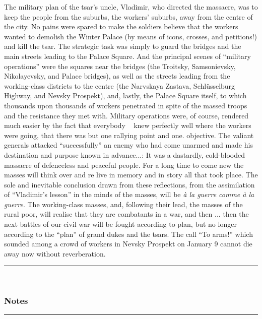 \documentclass[
]{article}
\begin{document}
The military plan of the tsar's uncle, Vladimir, who directed the
massacre, was to keep the people from the suburbs, the workers' suburbs,
away from the centre of the city. No pains were spared to make the
soldiers believe that the workers wanted to demolish the Winter Palace
(by means of icons, crosses, and petitions!) and kill the tsar. The
strategic task was simply to guard the bridges and the main streets
leading to the Palace Square. And the principal scenes of ``military
operations'' were the squares near the bridges (the Troitsky,
Samsonievsky, Nikolayevsky, and Palace bridges), as well as the streets
leading from the working-class districts to the centre (the Narvskaya
Zastava, Schlüsselburg Highway, and Nevsky Prospekt), and, lastly, the
Palace Square itself, to which thousands upon thousands of workers
penetrated in spite of the massed troops and the resistance they met
with. Military operations were, of course, rendered much easier by the
fact that everybody ~ knew perfectly well where the workers were going,
that there was but one rallying point and one. objective. The valiant
generals attacked ``successfully'' an enemy who had come unarmed and
made his destination and purpose known in advance...: It was a
dastardly, cold-blooded massacre of defenceless and peaceful people. For
a long time to come new the masses will think over and re live in memory
and in story all that took place. The sole and inevitable conclusion
drawn from these reflections, from the assimilation of ``Vladimir's
lesson'' in the minds of the masses, will be \emph{à la guerre comme à
la guerre}. The working-class masses, and, following their lead, the
masses of the rural poor, will realise that they are combatants in a
war, and then ... then the next battles of our civil war will be fought
according to plan, but no longer according to the ``plan'' of grand
dukes and the tsars. The call ``To arms!'' which sounded among a crowd
of workers in Nevsky Prospekt on January 9 cannot die away now without
reverberation.

\begin{center}\rule{0.5\linewidth}{0.5pt}\end{center}

~

\hypertarget{notes}{%
\subsubsection{Notes}\label{notes}}

\begin{center}\rule{0.5\linewidth}{0.5pt}\end{center}
\end{document}
